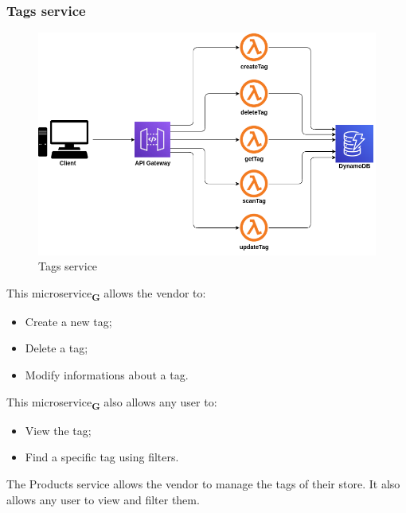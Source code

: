 \subsubsection{Tags service}
\begin{figure}[!h]
    \vspace{5px}
    \includegraphics[scale=0.5]{../../../../Images/Diagrammi/maintainerManual/tagsService.png}
    \centering
    \caption{Tags service}
\end{figure}
This microservice\textsubscript{\textbf{G}} allows the vendor to:
\begin{itemize}
    \item Create a new tag;
    \item Delete a tag;
    \item Modify informations about a tag.
\end{itemize}
This microservice\textsubscript{\textbf{G}} also allows any user to:
\begin{itemize}
    \item View the tag;
    \item Find a specific tag using filters.
\end{itemize}
The Products service allows the vendor to manage the tags of their store. It also allows any user to view and filter them.
\pagebreak
